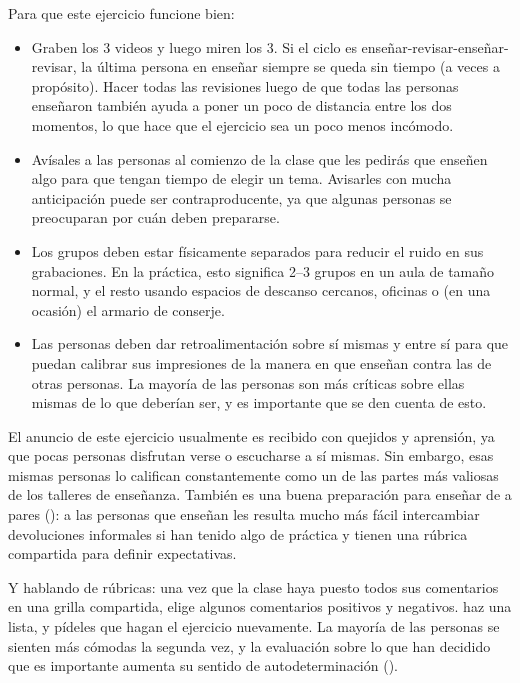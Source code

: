 Para que este ejercicio funcione bien:

\begin{itemize}

\item
  Graben los 3 videos y luego miren los 3.
  Si el ciclo es enseñar-revisar-enseñar-revisar,
  la última persona en enseñar siempre se queda sin tiempo
  (a veces a propósito).
  Hacer todas las revisiones luego de que todas las personas enseñaron
  también ayuda a poner un poco de distancia entre los dos momentos,
  lo que hace que el ejercicio sea un poco menos incómodo.

\item
  Avísales a las personas al comienzo de la clase que les pedirás que enseñen algo
  para que tengan tiempo de elegir un tema.
  Avisarles con mucha anticipación puede ser contraproducente,
  ya que algunas personas se preocuparan por cuán deben prepararse.

\item
  Los grupos deben estar físicamente separados para reducir el ruido en sus grabaciones.
  En la práctica,
  esto significa 2--3 grupos en un aula de tamaño normal,
  y el resto usando espacios de descanso cercanos, oficinas 
  o (en una ocasión) el armario de conserje.

\item
  Las personas deben dar retroalimentación sobre sí mismas y entre sí
  para que puedan calibrar sus impresiones de la manera en que enseñan
  contra las de otras personas.
  La mayoría de las personas son más críticas sobre ellas mismas de lo que deberían ser,
  y es importante que se den cuenta de esto.

\end{itemize}

El anuncio de este ejercicio usualmente es recibido con quejidos y aprensión,
ya que pocas personas disfrutan verse o escucharse a sí mismas.
Sin embargo,
esas mismas personas lo califican constantemente como un de las partes más valiosas de los talleres de enseñanza.
También es una buena preparación para enseñar de a pares ():
a las personas que enseñan les resulta mucho más fácil intercambiar devoluciones informales
si han tenido algo de práctica 
y tienen una rúbrica compartida para definir expectativas.

Y hablando de rúbricas:
una vez que la clase haya puesto todos sus comentarios en una grilla compartida,
elige algunos comentarios positivos y negativos.
haz una lista,
y pídeles que hagan el ejercicio nuevamente.
La mayoría de las personas se sienten más cómodas la segunda vez,
y la evaluación sobre lo que han decidido que es importante aumenta su sentido de autodeterminación ().

